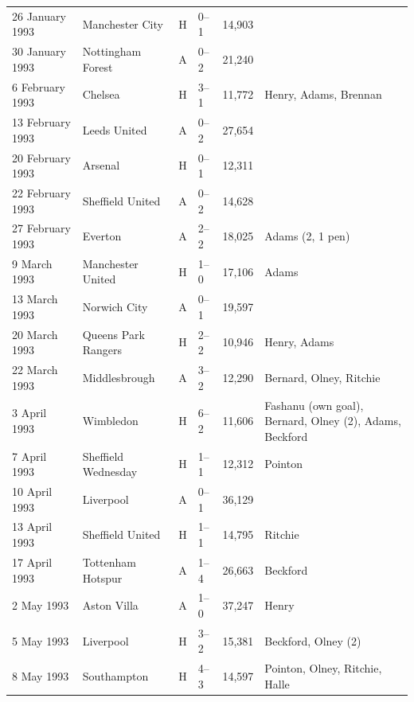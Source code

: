 \documentclass{article}
\begin{document}
\begin{tabular}{llllll}
26 January 1993 & Manchester City & H & 0–1 & 14,903 &  \\
30 January 1993 & Nottingham Forest & A & 0–2 & 21,240 &  \\
6 February 1993 & Chelsea & H & 3–1 & 11,772 & Henry, Adams, Brennan \\
13 February 1993 & Leeds United & A & 0–2 & 27,654 &  \\
20 February 1993 & Arsenal & H & 0–1 & 12,311 &  \\
22 February 1993 & Sheffield United & A & 0–2 & 14,628 &  \\
27 February 1993 & Everton & A & 2–2 & 18,025 & Adams (2, 1 pen) \\
9 March 1993 & Manchester United & H & 1–0 & 17,106 & Adams \\
13 March 1993 & Norwich City & A & 0–1 & 19,597 &  \\
20 March 1993 & Queens Park Rangers & H & 2–2 & 10,946 & Henry, Adams \\
22 March 1993 & Middlesbrough & A & 3–2 & 12,290 & Bernard, Olney, Ritchie \\
3 April 1993 & Wimbledon & H & 6–2 & 11,606 & Fashanu (own goal), Bernard, Olney (2), Adams, Beckford \\
7 April 1993 & Sheffield Wednesday & H & 1–1 & 12,312 & Pointon \\
10 April 1993 & Liverpool & A & 0–1 & 36,129 &  \\
13 April 1993 & Sheffield United & H & 1–1 & 14,795 & Ritchie \\
17 April 1993 & Tottenham Hotspur & A & 1–4 & 26,663 & Beckford \\
2 May 1993 & Aston Villa & A & 1–0 & 37,247 & Henry \\
5 May 1993 & Liverpool & H & 3–2 & 15,381 & Beckford, Olney (2) \\
8 May 1993 & Southampton & H & 4–3 & 14,597 & Pointon, Olney, Ritchie, Halle \\
\bottomrule
\end{tabular}
\end{document}
